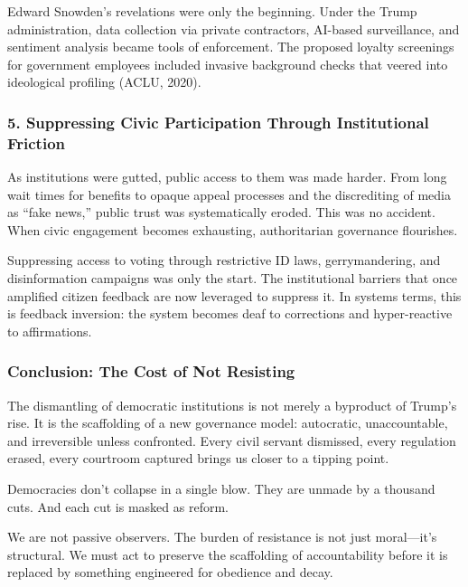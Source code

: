 Edward Snowden's revelations were only the beginning. Under the Trump
administration, data collection via private contractors, AI-based
surveillance, and sentiment analysis became tools of enforcement. The
proposed loyalty screenings for government employees included invasive
background checks that veered into ideological profiling (ACLU, 2020).

\subsubsection{\texorpdfstring{5. \textbf{Suppressing Civic
Participation Through Institutional
Friction}}{5. Suppressing Civic Participation Through Institutional Friction}}\label{suppressing-civic-participation-through-institutional-friction}

As institutions were gutted, public access to them was made harder. From
long wait times for benefits to opaque appeal processes and the
discrediting of media as ``fake news,'' public trust was systematically
eroded. This was no accident. When civic engagement becomes exhausting,
authoritarian governance flourishes.

Suppressing access to voting through restrictive ID laws,
gerrymandering, and disinformation campaigns was only the start. The
institutional barriers that once amplified citizen feedback are now
leveraged to suppress it. In systems terms, this is feedback inversion:
the system becomes deaf to corrections and hyper-reactive to
affirmations.

\subsubsection{Conclusion: The Cost of Not
Resisting}\label{conclusion-the-cost-of-not-resisting}

The dismantling of democratic institutions is not merely a byproduct of
Trump's rise. It is the scaffolding of a new governance model:
autocratic, unaccountable, and irreversible unless confronted. Every
civil servant dismissed, every regulation erased, every courtroom
captured brings us closer to a tipping point.

Democracies don't collapse in a single blow. They are unmade by a
thousand cuts. And each cut is masked as reform.

We are not passive observers. The burden of resistance is not just
moral---it's structural. We must act to preserve the scaffolding of
accountability before it is replaced by something engineered for
obedience and decay.

